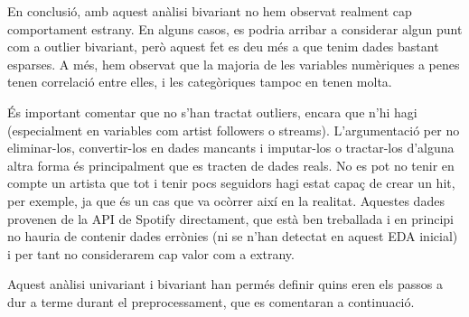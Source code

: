 En conclusió, amb aquest anàlisi bivariant no hem observat realment cap comportament estrany. En alguns casos, es podria arribar a considerar algun punt com a outlier bivariant, però aquest fet es deu més a que tenim dades bastant esparses. A més, hem observat que la majoria de les variables numèriques a penes tenen correlació entre elles, i les categòriques tampoc en tenen molta.

És important comentar que no s’han tractat outliers, encara que n’hi hagi (especialment en variables com artist followers o streams). L’argumentació per no eliminar-los, convertir-los en dades mancants i imputar-los o tractar-los d’alguna altra forma és principalment que es tracten de dades reals. No es pot no tenir en compte un artista que tot i tenir pocs seguidors hagi estat capaç de crear un hit, per exemple, ja que és un cas que va ocòrrer així en la realitat. Aquestes dades provenen de la API de Spotify directament, que està ben treballada i en principi no hauria de contenir dades errònies (ni se n’han detectat en aquest EDA inicial) i per tant no considerarem cap valor com a extrany.

Aquest anàlisi univariant i bivariant han permés definir quins eren els passos a dur a terme durant el preprocessament, que es comentaran a continuació.
